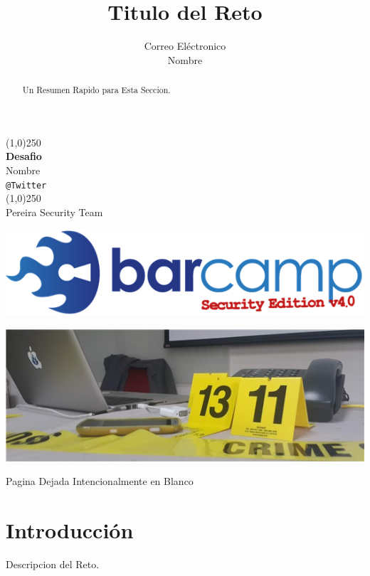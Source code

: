 \documentclass[a4paper]{article}
\title{Titulo del Reto }
\author{Correo El\'ectronico \\Nombre}
\begin{document}
\begin{titlepage} 				
\begin{center}	  				
\vfill
\line(1,0){250}\\ 				%
\huge\textbf{Desafio}\\	
\large{Nombre}\\
\large\texttt{@Twitter}\\
\line(1,0){250}\\
\large{Pereira Security Team}
\end{center}
\vspace{4em}
\centerline{\includegraphics[width=\textwidth]{barcampse_2013_logo-_281_29}} 			%
\vspace{7em}																			%
\centerline{\includegraphics[width=\textwidth]{afr}} 									%


\end{titlepage}
\clearpage
    \thispagestyle{empty}
    \phantom{a}
    \vfill
    \begin{center}Pagina Dejada Intencionalmente en Blanco\end{center}
    \vfill
\newpage
\tableofcontents
\newpage
\clearpage
\begin{abstract}
Un Resumen Rapido para Esta Seccion.
\end{abstract}
\section{Introducci\'on}
Descripcion del Reto.
\end{document}
